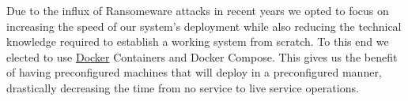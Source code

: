 	Due to the influx of Ransomeware attacks in recent years\cite{august2019economics} we opted to focus on increasing the speed of our system's deployment while also reducing the technical knowledge required to establish a working system from scratch. To this end we elected to use \hyperlink{https://www.docker.com/}{Docker} Containers and Docker Compose. This gives us the benefit of having preconfigured machines that will deploy in a preconfigured manner, drastically decreasing the time from no service to live service operations. 
